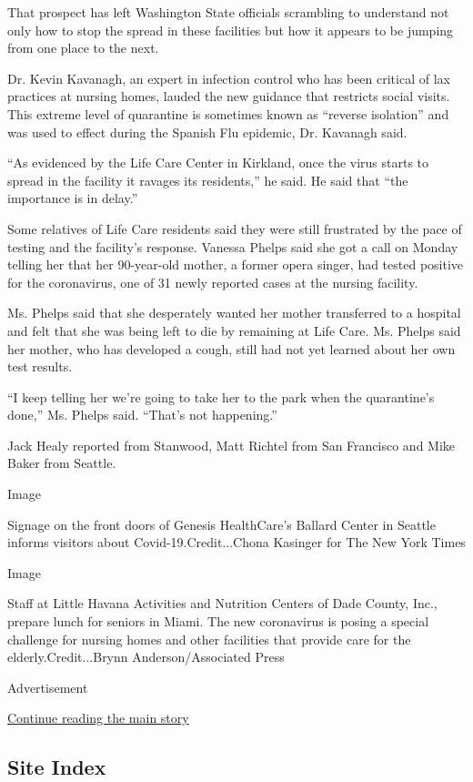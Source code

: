 That prospect has left Washington State officials scrambling to
understand not only how to stop the spread in these facilities but how
it appears to be jumping from one place to the next.

Dr. Kevin Kavanagh, an expert in infection control who has been critical
of lax practices at nursing homes, lauded the new guidance that
restricts social visits. This extreme level of quarantine is sometimes
known as ``reverse isolation'' and was used to effect during the Spanish
Flu epidemic, Dr. Kavanagh said.

``As evidenced by the Life Care Center in Kirkland, once the virus
starts to spread in the facility it ravages its residents,'' he said. He
said that ``the importance is in delay.''

Some relatives of Life Care residents said they were still frustrated by
the pace of testing and the facility's response. Vanessa Phelps said she
got a call on Monday telling her that her 90-year-old mother, a former
opera singer, had tested positive for the coronavirus, one of 31 newly
reported cases at the nursing facility.

Ms. Phelps said that she desperately wanted her mother transferred to a
hospital and felt that she was being left to die by remaining at Life
Care. Ms. Phelps said her mother, who has developed a cough, still had
not yet learned about her own test results.

``I keep telling her we're going to take her to the park when the
quarantine's done,'' Ms. Phelps said. ``That's not happening.''

Jack Healy reported from Stanwood, Matt Richtel from San Francisco and
Mike Baker from Seattle.

Image

Signage on the front doors of Genesis HealthCare's Ballard Center in
Seattle informs visitors about Covid-19.Credit...Chona Kasinger for The
New York Times

Image

Staff at Little Havana Activities and Nutrition Centers of Dade County,
Inc., prepare lunch for seniors in Miami. The new coronavirus is posing
a special challenge for nursing homes and other facilities that provide
care for the elderly.Credit...Brynn Anderson/Associated Press

Advertisement

\protect\hyperlink{after-bottom}{Continue reading the main story}

\hypertarget{site-index}{%
\subsection{Site Index}\label{site-index}}

